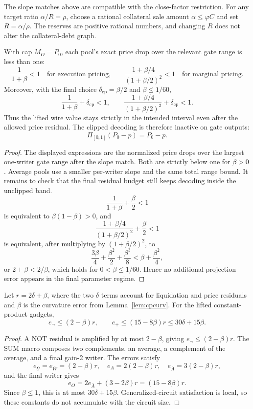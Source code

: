 \documentclass{llncs}
\newcommand{\clip}{\Pi}
\newcommand{\cf}{\varphi}
\begin{document}
\begin{remark}
The slope matches above are compatible with the close-factor restriction. For any target ratio \(\alpha/R=\rho\), choose a rational collateral sale amount \(\alpha\le \cf C\) and set \(R=\alpha/\rho\). The reserves are positive rational numbers, and changing \(R\) does not alter the collateral-debt graph.
\end{remark}

\begin{lemma}[range]
\label{lem:cprange}
With cap \(M_O=P_0\), each pool's exact price drop over the relevant gate range is less than one:
\[
        \frac{1}{1+\beta}<1
        \quad\text{for execution pricing,}\qquad
        \frac{1+\beta/4}{(1+\beta/2)^2}<1
        \quad\text{for marginal pricing.}
\]
Moreover, with the final choice \(\delta_{\mathrm{cp}}=\beta/2\) and \(\beta\le1/60\),
\[
        \frac{1}{1+\beta}+\delta_{\mathrm{cp}}<1,
        \qquad
        \frac{1+\beta/4}{(1+\beta/2)^2}+\delta_{\mathrm{cp}}<1 .
\]
Thus the lifted wire value stays strictly in the intended interval even after the allowed price residual. The clipped decoding is therefore inactive on gate outputs:
\[
        \clip_{[0,1]}(P_0-p)=P_0-p .
\]
\end{lemma}
\begin{proof}
The displayed expressions are the normalized price drops over the largest one-writer gate range after the slope match. Both are strictly below one for \(\beta>0\). Average pools use a smaller per-writer slope and the same total range bound. It remains to check that the final residual budget still keeps decoding inside the unclipped band.
\[
        \frac{1}{1+\beta}+\frac{\beta}{2}<1
\]
is equivalent to \(\beta(1-\beta)>0\), and
\[
        \frac{1+\beta/4}{(1+\beta/2)^2}+\frac{\beta}{2}<1
\]
is equivalent, after multiplying by \((1+\beta/2)^2\), to
\[
        \frac{3\beta}{4}+\frac{\beta^2}{2}+\frac{\beta^3}{8}
        < \beta+\frac{\beta^2}{4},
\]
or \(2+\beta<2/\beta\), which holds for \(0<\beta\le1/60\). Hence no additional projection error appears in the final parameter regime.
\end{proof}

\begin{lemma}
\label{lem:cpB}
Let \(r=2\delta+\beta\), where the two \(\delta\) terms account for liquidation and price residuals and \(\beta\) is the curvature error from Lemma~\ref{lem:cpcurv}. For the lifted constant-product gadgets,
\[
        e_{\neg}\le (2-\beta)r,\qquad
        e_+\le (15-8\beta)r\le 30\delta+15\beta .
\]
\end{lemma}
\begin{proof}
A NOT residual is amplified by at most \(2-\beta\), giving \(e_{\neg}\le(2-\beta)r\). The SUM macro composes two complements, an average, a complement of the average, and a final gain-2 writer. The errors satisfy
\[
 e_{\bar U}=e_{\bar W}=(2-\beta)r,\quad
 e_A=2(2-\beta)r,\quad
 e_{\bar A}=3(2-\beta)r,
\]
and the final writer gives
\[
 e_O=2e_{\bar A}+(3-2\beta)r=(15-8\beta)r .
\]
Since \(\beta\le1\), this is at most \(30\delta+15\beta\). Generalized-circuit satisfaction is local, so these constants do not accumulate with the circuit size.
\end{proof}
\end{document}
